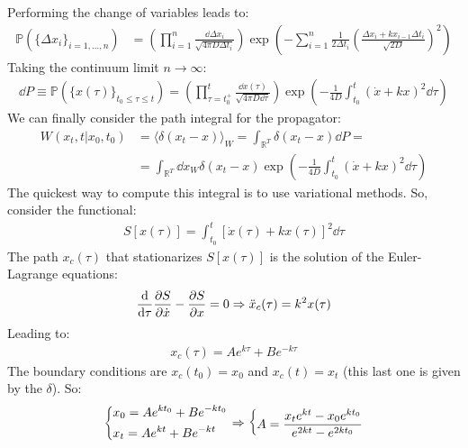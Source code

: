 \documentclass[../template.tex]{subfiles}
\begin{document}
\begin{exo}
    Performing the change of variables leads to:
    \begin{align} %
        \mathbb{P}(\{\Delta x_i\}_{i=1,\dots,n}) &=\left( \prod_{i=1}^n  \frac{\dd{\Delta x_i}}{\sqrt{4 \pi D \Delta t_i}}  \right) \exp\left(-\sum_{i=1}^n \frac{1}{2 \Delta t_i} \left(\frac{\Delta x_i + k x_{i-1} \Delta t_i}{\sqrt{2D}} \right)^2 \right)
        \label{eqn:dP1}
    \end{align}
    Taking the continuum limit $n \to \infty$:
    \begin{align*}
        \dd{P} \equiv \mathbb{P}(\{x(\tau)\}_{t_0 \leq \tau \leq t}) = \left(\prod_{\tau = t_0^+}^t \frac{\dd{x(\tau)}}{\sqrt{4 \pi D \dd{\tau}}} \right) \exp\left(-\frac{1}{4D} \int_{t_0}^t (\dot{x} + kx)^2 \dd{\tau} \right)
    \end{align*}
We can finally consider the path integral for the propagator:
\begin{align*}
    W(x_t,t|x_0,t_0) &= \langle \delta(x_t - x) \rangle_W = \int_{\mathbb{R}^T} \delta(x_t - x) \dd{P} =\\
    &= \int_{\mathbb{R}^T} \dd{x_W} \delta(x_t - x) \exp\left(-\frac{1}{4D} \int_{t_0}^t (\dot{x} + kx)^2 \dd{\tau} \right)
\end{align*}
The quickest way to compute this integral is to use variational methods. So, consider the functional:
\begin{align*}
    S[x(\tau)] = \int_{t_0}^t [\dot{x}(\tau) + kx(\tau)]^2 \dd{\tau}
\end{align*}
The path $x_c(\tau)$ that stationarizes $S[x(\tau)]$ is the solution of the Euler-Lagrange equations:
\begin{align*}
    \dv{\tau} \pdv{S}{\dot{x}} (x_c) - \pdv{S}{x} (x_c) = 0 \Rightarrow \ddot{x}_c(\tau) = k^2 x(\tau)
\end{align*}
Leading to:
\begin{align*}
    x_c(\tau) = A e^{k \tau} + B e^{-k \tau}
\end{align*}
The boundary conditions are $x_c(t_0) = x_0$ and $x_c(t) = x_t$ (this last one is given by the $\delta$). So:
\begin{align*}
    \begin{dcases}
        x_0 = A e^{kt_0} + B e^{-k t_0 }\\
        x_t = A e^{kt} + B e^{-kt}
    \end{dcases} \Rightarrow \begin{dcases}
        A = \frac{x_t e^{kt} - x_0 e^{k t_0 }}{e^{2kt} - e^{2k t_0}}\\

\end{dcases}
\end{align*}
\end{exo}
\end{document}
